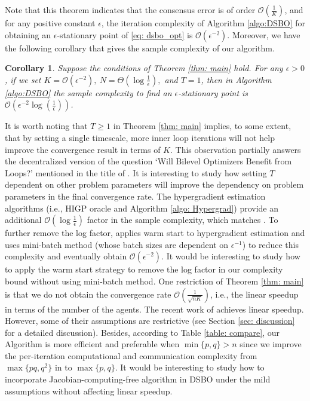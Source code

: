 \documentclass{article}
\theoremstyle{plain}
\newtheorem{corollary}[theorem]{Corollary}
\theoremstyle{definition}
\theoremstyle{remark}
\newcommand{\cO}{\mathcal{O}}
\begin{document}
Note that this theorem indicates that the consensus error is of order $\cO\left(\frac{1}{K}\right)$, and for any positive constant $\epsilon$, the iteration complexity of Algorithm \ref{algo:DSBO} for obtaining an $\epsilon$-stationary point of \eqref{eq: dsbo_opt} is $\cO(\epsilon^{-2})$. Moreover, we have the following corollary that gives the sample complexity of our algorithm.
\begin{corollary}\label{cor: samples}
    Suppose the conditions of Theorem \ref{thm: main} hold. For any $\epsilon>0$, if we set $K=\cO\left(\epsilon^{-2}\right),\ N = \Theta(\log \frac{1}{\epsilon}),$ and $T=1$, then in Algorithm \ref{algo:DSBO} the sample complexity to find an $\epsilon$-stationary point is $\cO(\epsilon^{-2}\log(\frac{1}{\epsilon}))$. 
\end{corollary}
It is worth noting that $T\geq 1$ in Theorem \ref{thm: main} implies, to some extent, that by setting a single timescale, more inner loop iterations will not help improve the convergence result in terms of $K$. This observation partially answers the decentralized version of the question `Will Bilevel Optimizers Benefit from Loops?' mentioned in the title of \citet{ji2022will}. It is interesting to study how setting $T$ dependent on other problem parameters will improve the dependency on problem parameters in the final convergence rate. The hypergradient estimation algorithms (i.e., HIGP oracle and Algorithm \ref{algo: Hypergrad}) provide an additional $\cO(\log \frac{1}{\epsilon})$ factor in the sample complexity, which matches \citet{chen2021closing}. To further remove the log factor, \citet{arbel2021amortized} applies warm start to hypergradient estimation and uses mini-batch method (whose batch sizes are dependent on $\epsilon^{-1}$) to reduce this complexity and eventually obtain $\cO(\epsilon^{-2})$. It would be interesting to study how to apply the warm start strategy to remove the log factor in our complexity bound without using mini-batch method. One restriction of Theorem \ref{thm: main} is that we do not obtain the convergence rate $\cO(\frac{1}{\sqrt{nK}})$, i.e., the linear speedup in terms of the number of the agents. The recent work of \citet{yang2022decentralized} achieves linear speedup. However, some of their assumptions are restrictive (see Section \ref{sec: discussion} for a detailed discussion). Besides, according to Table \ref{table: compare}, our Algorithm is more efficient and preferable when $\min\{p, q\} > n$ since we improve the per-iteration computational and communication complexity from $\max\{pq, q^2\}$ in \citet{yang2022decentralized} to $\max\{p, q\}$. It would be interesting to study how to incorporate Jacobian-computing-free algorithm in DSBO under the mild assumptions without affecting linear speedup.
\end{document}
